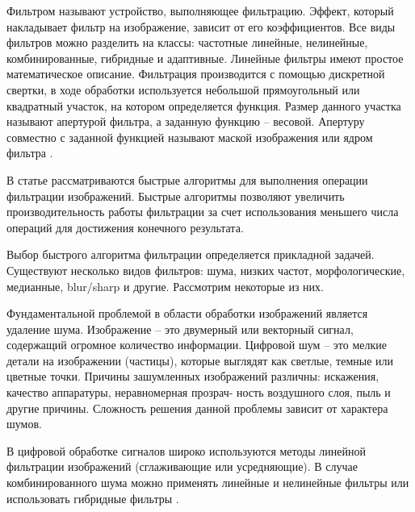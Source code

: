 Фильтром называют устройство, выполняющее фильтрацию. Эффект, который накладывает фильтр на изображение, зависит от его коэффициентов. Все виды фильтров можно разделить на классы: частотные линейные, нелинейные, комбинированные, гибридные и адаптивные. Линейные фильтры имеют простое математическое описание. Фильтрация производится с помощью дискретной свертки, в ходе обработки используется небольшой прямоугольный или квадратный участок, на котором определяется функция. Размер данного участка называют апертурой фильтра, а заданную функцию – весовой. Апертуру совместно с заданной функцией называют маской изображения или ядром фильтра \cite{bondina2012comparative}.

В статье \cite{application_of_fast2018} рассматриваются быстрые алгоритмы для выполнения операции фильтрации изображений. Быстрые алгоритмы позволяют увеличить производительность работы фильтрации за счет использования меньшего числа операций для достижения конечного результата.

Выбор быстрого алгоритма фильтрации определяется прикладной задачей. Существуют несколько видов фильтров: шума, низких частот, морфологические, медианные, blur/sharp и другие. Рассмотрим некоторые из них.

Фундаментальной проблемой в области обработки изображений является удаление шума. Изображение – это двумерный или векторный сигнал, содержащий огромное количество информации. Цифровой шум – это мелкие детали на изображении (частицы), которые выглядят как светлые, темные или цветные точки. Причины зашумленных изображений различны: искажения, качество аппаратуры, неравномерная прозрач-
ность воздушного слоя, пыль и другие причины. Сложность решения данной проблемы зависит от характера шумов.

В цифровой обработке сигналов широко используются методы линейной фильтрации изображений (сглаживающие или усредняющие). В случае комбинированного шума можно применять линейные и нелинейные фильтры или использовать гибридные фильтры 
\cite{Soynikova2016high-performance}.


